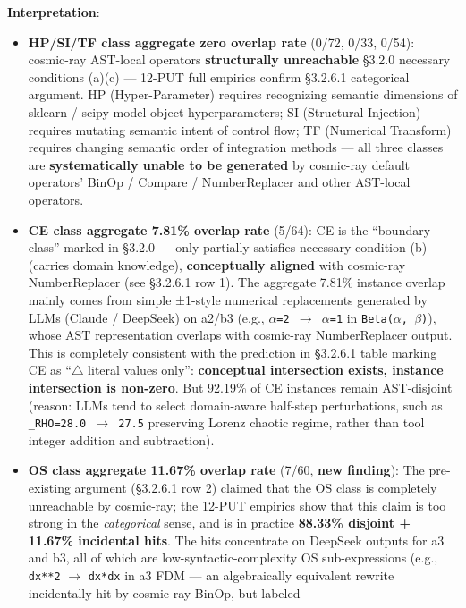 \documentclass[review,12pt,authoryear]{elsarticle}
\begin{document}
\textbf{Interpretation}:

\begin{itemize}
\item
  \textbf{HP/SI/TF class aggregate zero overlap rate} (0/72, 0/33,
  0/54): cosmic-ray AST-local operators \textbf{structurally
  unreachable} §3.2.0 necessary conditions (a)(c) --- 12-PUT full
  empirics confirm §3.2.6.1 categorical argument. HP (Hyper-Parameter)
  requires recognizing semantic dimensions of sklearn / scipy model
  object hyperparameters; SI (Structural Injection) requires mutating
  semantic intent of control flow; TF (Numerical Transform) requires
  changing semantic order of integration methods --- all three classes
  are \textbf{systematically unable to be generated} by cosmic-ray
  default operators' BinOp / Compare / NumberReplacer and other
  AST-local operators.
\item
  \textbf{CE class aggregate 7.81\% overlap rate} (5/64): CE is the
  ``boundary class'' marked in §3.2.0 --- only partially satisfies
  necessary condition (b) (carries domain knowledge),
  \textbf{conceptually aligned} with cosmic-ray NumberReplacer (see
  §3.2.6.1 row 1). The aggregate 7.81\% instance overlap mainly comes
  from simple ±1-style numerical replacements generated by LLMs (Claude
  / DeepSeek) on a2/b3 (e.g., \texttt{$\alpha$=2\ $\to$\ $\alpha$=1} in
  \texttt{Beta($\alpha$,\ $\beta$)}), whose AST representation overlaps with
  cosmic-ray NumberReplacer output. This is completely consistent with
  the prediction in §3.2.6.1 table marking CE as ``$\bigtriangleup$ literal values
  only'': \textbf{conceptual intersection exists, instance intersection
  is non-zero}. But 92.19\% of CE instances remain AST-disjoint (reason:
  LLMs tend to select domain-aware half-step perturbations, such as
  \texttt{\_RHO=28.0\ $\to$\ 27.5} preserving Lorenz chaotic regime, rather
  than tool integer addition and subtraction).
\item
  \textbf{OS class aggregate 11.67\% overlap rate} (7/60, \textbf{new
  finding}): The pre-existing argument (§3.2.6.1 row 2) claimed that the
  OS class is completely unreachable by cosmic-ray; the 12-PUT empirics
  show that this claim is too strong in the \emph{categorical} sense,
  and is in practice \textbf{88.33\% disjoint + 11.67\% incidental
  hits}. The hits concentrate on DeepSeek outputs for a3 and b3, all of
  which are low-syntactic-complexity OS sub-expressions (e.g.,
  \texttt{dx**2} $\to$ \texttt{dx*dx} in a3 FDM --- an algebraically
  equivalent rewrite incidentally hit by cosmic-ray BinOp, but labeled

\end{itemize}
\end{document}

